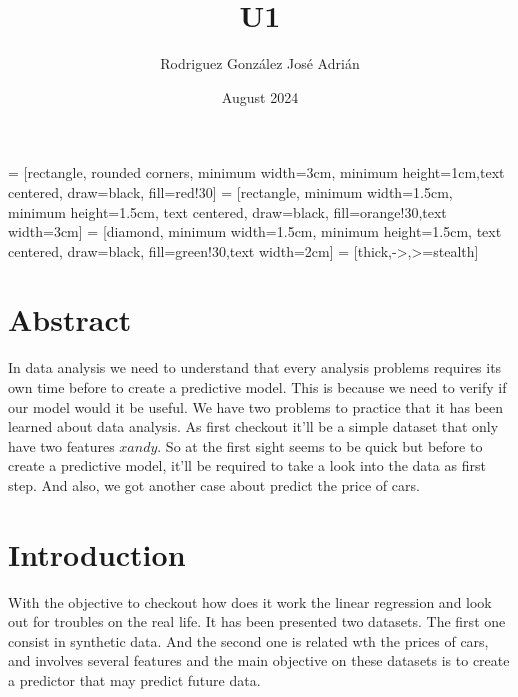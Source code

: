 \documentclass{article}
\title{U1}
\author{Rodriguez González José Adrián }
\date{August 2024}
\begin{document}
\maketitle
{} = [rectangle, rounded corners, minimum width=3cm, minimum height=1cm,text centered, draw=black, fill=red!30]
 = [rectangle, minimum width=1.5cm, minimum height=1.5cm, text centered, draw=black, fill=orange!30,text width=3cm]
 = [diamond,  minimum width=1.5cm, minimum height=1.5cm, text centered, draw=black, fill=green!30,text width=2cm]
 = [thick,->,>=stealth]
\section{Abstract}
In data analysis we need to understand that every analysis problems requires its own time before to create a predictive model. This is because we need to verify if our model would it be useful.
We have two problems to practice that it has been learned about data analysis. As first checkout it'll be a simple dataset that only have two features \(x and y\). So at the first sight seems to be quick but before to create a predictive model, it'll be required to take a look into the data as first step. And also, we got another case about predict the price of cars.
\section{Introduction}
With the objective to checkout how does it work the linear regression and look out for troubles on the real life. It has been presented two datasets. The first one consist in synthetic data.
And the second one is related wth the prices of cars, and involves several features and the main objective on these datasets is to create a predictor that may predict future data.
\end{document}
